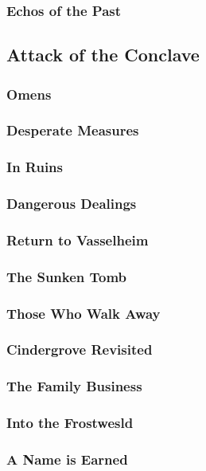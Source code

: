         \subsubsection{Echos of the Past}
        
    \newpage
    \subsection{Attack of the Conclave} \vspace*{\fill}
    \newpage
        \subsubsection{Omens}
        \subsubsection{Desperate Measures}
        \subsubsection{In Ruins}
        \subsubsection{Dangerous Dealings}
        \subsubsection{Return to Vasselheim}
        \subsubsection{The Sunken Tomb}
        \subsubsection{Those Who Walk Away}
        \subsubsection{Cindergrove Revisited}
        \subsubsection{The Family Business}
        \subsubsection{Into the Frostwesld}
        \subsubsection{A Name is Earned}
